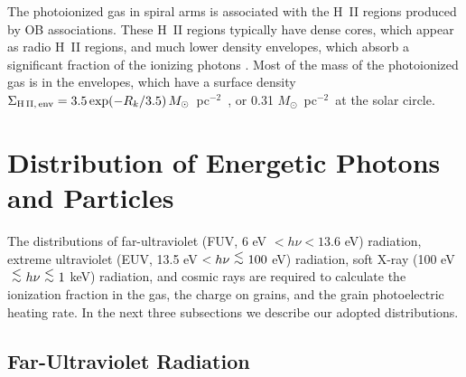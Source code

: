 \documentclass[12pt,preprint,flushrt]{aastex}
\newcommand{\ee}{$^{-2}$}
\newcommand{\al}{\mbox{ \raisebox{-.4ex}{$\stackrel{\textstyle <}{\sim}$} }}
\begin{document}
The photoionized gas in spiral arms
is associated with the H~II regions produced by
OB associations.  These H~II regions typically have
dense cores, which appear as radio H~II regions,
and much lower density envelopes, which absorb
a significant fraction of the ionizing photons
\citep{ana85,mck97}.  Most of the mass of the photoionized
gas is in the envelopes, which have a surface density
$\Sigma_{\rm H\,II,\, env}=3.5\exp(-R_k/3.5)\, M_\odot$~pc\ee\
\citep{mck97}, or 0.31 $M_\odot$~pc\ee\ at the solar circle.


\section{Distribution of Energetic
             Photons and Particles}
\label{EnergeticPhotons}

The distributions of far-ultraviolet (FUV, 6 eV $< h\nu < 13.6$ eV)
radiation, extreme ultraviolet (EUV, 13.5 eV $< h\nu \al 100$ eV)
radiation, soft X-ray (100 eV $ \al h\nu \al 1$ keV) radiation,
and cosmic rays are required to calculate the ionization fraction in the
gas, the charge on grains, and the grain photoelectric
heating rate. In the next three subsections we describe our adopted
distributions.

\subsection{Far-Ultraviolet Radiation}\label{sec:FUVradfield}
\end{document}
